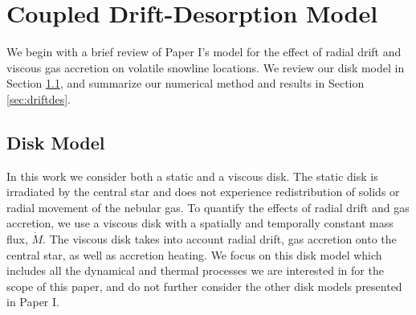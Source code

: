 \documentclass[apj]{emulateapj}
\newcommand{\emgr}[1]{\emph{ \color{gray} #1}}
\begin{document}



\section{Coupled Drift-Desorption Model}
\label{sec:review}

We begin with a brief review of Paper I's model for the effect of radial drift and viscous gas accretion on volatile snowline locations. We review our disk model in Section \ref{sec:disktime}, and summarize our numerical method and results in Section \ref{sec:driftdes}.

\subsection{Disk Model}
\label{sec:disktime}

In this work we consider both a static and a viscous disk. The static disk is irradiated by the central star and does not experience redistribution of solids or radial movement of the nebular gas. To quantify the effects of radial drift and gas accretion, we use a viscous disk with a spatially and temporally constant mass flux, $\dot{M}$. The viscous disk takes into account radial drift, gas accretion onto the central star, as well as accretion heating. We focus on this disk model which includes all the dynamical and thermal processes we are interested in for the scope of this paper, and do not further consider the other disk models presented in Paper I.  
\end{document}
